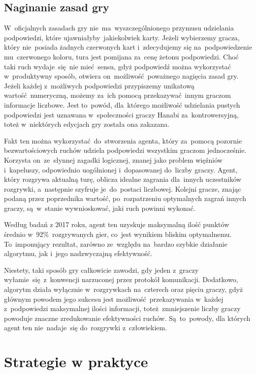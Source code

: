 \documentclass[declaration,shortabstract,inz]{iithesis}
\begin{document}
\section{Naginanie zasad gry}

W~oficjalnych zasadach gry nie~ma~wyszczególnionego przymusu udzielania podpowiedzi, które ujawniałyby jakiekolwiek karty. Jeżeli wybierzemy gracza, który nie~posiada żadnych czerwonych kart i~zdecydujemy się na~podpowiedzenie mu~czerwonego koloru, tura jest pomijana za~cenę żetonu podpowiedzi. Choć taki ruch wydaje~się~nie mieć sensu, gdyż podpowiedź można wykorzystać w~produktywny sposób, otwiera on~możliwość poważnego nagięcia zasad gry. Jeżeli każdej z~możliwych podpowiedzi przypiszemy unikatową wartość numeryczną, możemy za~ich pomocą przekazywać innym graczom informacje liczbowe. Jest to~powód, dla~którego możliwość udzielania pustych podpowiedzi jest uznawana w~społeczności graczy Hanabi za~kontrowersyjną, toteż w~niektórych edycjach gry została ona zakazana.

Fakt ten można wykorzystać do~stworzenia agenta, który za~pomocą pozornie bezwartościowych ruchów udziela podpowiedzi wszystkim graczom jednocześnie. Korzysta on~ze~słynnej zagadki logicznej, znanej jako problem więźniów i~kapeluszy, odpowiednio uogólnionej i~dopasowanej do~liczby graczy. Agent, który rozgrywa aktualną turę, oblicza idealne zagrania dla~innych uczestników rozgrywki, a~następnie szyfruje je~do~postaci liczbowej. Kolejni gracze, znając podaną przez poprzednika wartość, po~rozpatrzeniu optymalnych zagrań innych graczy, są~w~stanie wywnioskować, jaki ruch powinni wykonać.

Według badań z 2017 roku\cite{HatPlayer}, agent ten uzyskuje maksymalną ilość punktów średnio w~92\%~rozgrywanych gier, co~jest wynikiem bliskim optymalnemu. To~imponujący rezultat, zarówno ze~względu na~bardzo szybkie działanie algorytmu, jak i~jego nadzwyczajną efektywność.

Niestety, taki sposób gry całkowicie zawodzi, gdy jeden z~graczy wyłamie~się z~konwencji narzuconej przez protokół komunikacji. Dodatkowo, algorytm działa wyłącznie w~rozgrywkach na~czterech oraz pięciu graczy, gdyż głównym powodem jego sukcesu jest możliwość przekazywania w~każdej z~podpowiedzi maksymalnej ilości informacji, toteż~zmniejszenie liczby graczy powoduje znaczne zredukowanie efektywności ruchów. Są~to~powody, dla których agent ten nie~nadaje~się do~rozgrywki z~człowiekiem.

\chapter{Strategie w praktyce}
\end{document}
